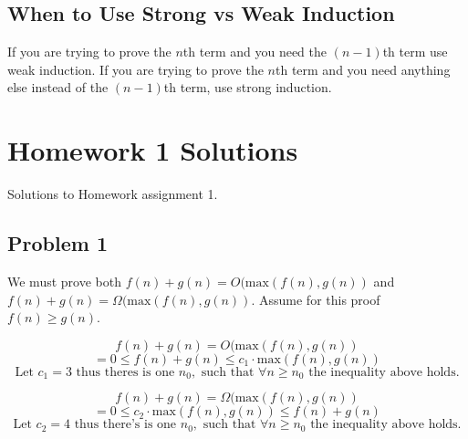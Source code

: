 \documentclass{article}
\begin{document}
\subsection{When to Use Strong vs Weak Induction}

If you are trying to prove the $n$th term and you need the $(n-1)$th term use weak induction. If you are trying to prove the $n$th term and you need anything else instead of the $(n-1)$th term, use strong induction.

\iftrue
    
%
%
%
%

%
%
%
%








\fi
\section{Homework 1 Solutions}

Solutions to Homework assignment 1.

\subsection{Problem 1}

We must prove both $f(n) + g(n) = O(\text{max}(f(n),g(n))$ and $f(n) + g(n) = \Omega(\text{max}(f(n),g(n))$. Assume for this proof $f(n) \ge g(n)$.

$$f(n) + g(n) = O(\text{max}(f(n),g(n))$$
$$= 0 \le f(n) + g(n) \le c_1 \cdot \text{max}(f(n),g(n))$$
$$\text{Let } c_1 = 3 \text{ thus theres is one } n_0, \text{ such that } \forall n \ge n_0 \text{ the inequality above holds.}$$

$$f(n) + g(n) = \Omega(\text{max}(f(n),g(n))$$
$$= 0 \le c_2 \cdot \text{max}(f(n),g(n)) \le f(n) + g(n) $$
$$\text{Let } c_2 = 4 \text{ thus there's is one } n_0, \text{ such that } \forall n \ge n_0 \text{ the inequality above holds.}$$
\end{document}
